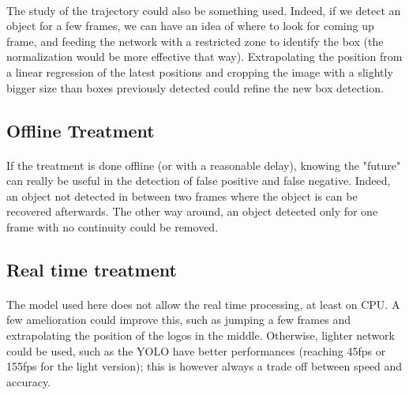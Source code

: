 \documentclass[12pt]{article}%
\begin{document}
\paragraph{}
The study of the trajectory could also be something used. Indeed, if we detect an object for a few frames, we can have an idea of where to look for coming up frame, and feeding the network with a restricted zone to identify the box (the normalization would be more effective that way). Extrapolating the position from a linear regression of the latest positions and cropping the image with a slightly bigger size than boxes previously detected could refine the new box detection.

\subsection{Offline Treatment}
\paragraph{}
If the treatment is done offline (or with a reasonable delay), knowing the "future" can really be useful in the detection of false positive and false negative. Indeed, an object not detected in between two frames where the object is can be recovered afterwards. The other way around, an object detected only for one frame with no continuity could be removed.

\subsection{Real time treatment}
\paragraph{}
The model used here does not allow the real time processing, at least on CPU. A few amelioration could improve this, such as jumping a few frames and extrapolating the position of the logos in the middle. Otherwise, lighter network could be used, such as the YOLO \cite{yolo} have better performances (reaching 45fps or 155fps for the light version); this is however always a trade off between speed and accuracy.
\end{document}
